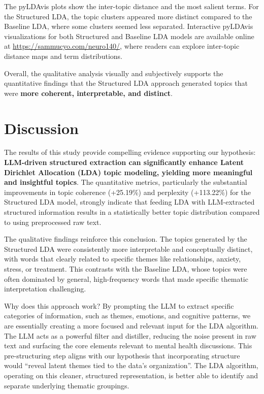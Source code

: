 \documentclass{article}
\begin{document}
The pyLDAvis plots show the inter-topic distance and the most salient terms. For the Structured LDA, the topic clusters appeared more distinct compared to the Baseline LDA, where some clusters seemed less separated. Interactive pyLDAvis visualizations for both Structured and Baseline LDA models are available online at \url{https://sammucyo.com/neuro140/}, where readers can explore inter-topic distance maps and term distributions.



Overall, the qualitative analysis visually and subjectively supports the quantitative findings that the Structured LDA approach generated topics that were \textbf{more coherent, interpretable, and distinct}.

\section{Discussion}

The results of this study provide compelling evidence supporting our hypothesis: \textbf{LLM-driven structured extraction can significantly enhance Latent Dirichlet Allocation (LDA) topic modeling, yielding more meaningful and insightful topics}. The quantitative metrics, particularly the substantial improvements in topic coherence (+25.19\%) and perplexity (+113.22\%) for the Structured LDA model, strongly indicate that feeding LDA with LLM-extracted structured information results in a statistically better topic distribution compared to using preprocessed raw text.

The qualitative findings reinforce this conclusion. The topics generated by the Structured LDA were consistently more interpretable and conceptually distinct, with words that clearly related to specific themes like relationships, anxiety, stress, or treatment. This contrasts with the Baseline LDA, whose topics were often dominated by general, high-frequency words that made specific thematic interpretation challenging.

Why does this approach work? By prompting the LLM to extract specific categories of information, such as themes, emotions, and cognitive patterns, we are essentially creating a more focused and relevant input for the LDA algorithm. The LLM acts as a powerful filter and distiller, reducing the noise present in raw text and surfacing the core elements relevant to mental health discussions. This pre-structuring step aligns with our hypothesis that incorporating structure would ``reveal latent themes tied to the data's organization''. The LDA algorithm, operating on this cleaner, structured representation, is better able to identify and separate underlying thematic groupings.
\end{document}
